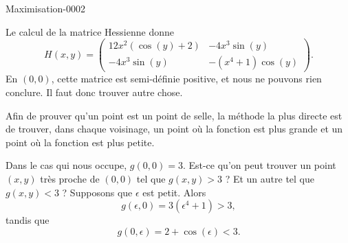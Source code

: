 
\begin{corrige}{Maximisation-0002}

	Le calcul de la matrice Hessienne donne
	\begin{equation}
		H(x,y)=\begin{pmatrix}
			12x^2(\cos(y)+2)	&	-4x^3\sin(y)	\\ 
			-4x^3\sin(y)	&	-(x^4+1)\cos(y)	
		\end{pmatrix}.
	\end{equation}
	En $(0,0)$, cette matrice est semi-définie positive, et nous ne pouvons rien conclure. Il faut donc trouver autre chose.

	Afin de prouver qu'un point est un point de selle, la méthode la plus directe est de trouver, dans chaque voisinage, un point où la fonction est plus grande et un point où la fonction est plus petite.

	Dans le cas qui nous occupe, $g(0,0)=3$. Est-ce qu'on peut trouver un point $(x,y)$ très proche de $(0,0)$ tel que $g(x,y)>3$ ? Et un autre tel que $g(x,y)<3$ ? Supposons que $\epsilon$ est petit. Alors
	\begin{equation}
		g(\epsilon,0)=3(\epsilon^4+1)>3,
	\end{equation}
	tandis que 
	\begin{equation}
		g(0,\epsilon)=2+\cos(\epsilon)<3.
	\end{equation}
	

\end{corrige}
